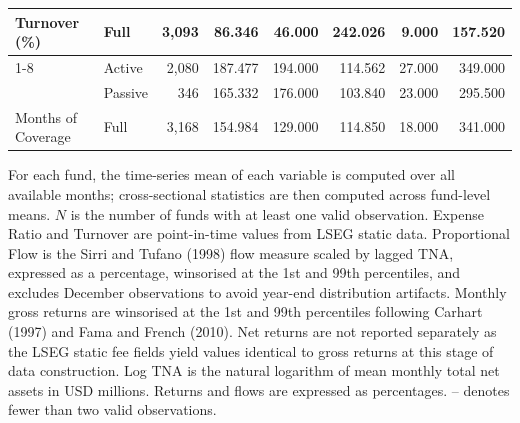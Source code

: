 \begin{table}[!h]
\begin{threeparttable}
{\begin{tabular}[t]{llrrrrrr}
\multirow{-3}{*}{\raggedright\arraybackslash Turnover (\%)} & Full & 3,093 & 86.346 & 46.000 & 242.026 & 9.000 & 157.520\\
\cmidrule{1-8}
 & Active & 2,080 & 187.477 & 194.000 & 114.562 & 27.000 & 349.000\\

 & Passive & 346 & 165.332 & 176.000 & 103.840 & 23.000 & 295.500\\

\multirow{-3}{*}{\raggedright\arraybackslash Months of Coverage} & Full & 3,168 & 154.984 & 129.000 & 114.850 & 18.000 & 341.000\\
\bottomrule
\end{tabular}
}
\begin{tablenotes}
\item For each fund, the time-series mean of each variable is computed over all available months; cross-sectional statistics are then computed across fund-level means. $N$ is the number of funds with at least one valid observation. Expense Ratio and Turnover are point-in-time values from LSEG static data. Proportional Flow is the Sirri and Tufano (1998) flow measure scaled by lagged TNA, expressed as a percentage, winsorised at the 1st and 99th percentiles, and excludes December observations to avoid year-end distribution artifacts. Monthly gross returns are winsorised at the 1st and 99th percentiles following Carhart (1997) and Fama and French (2010). Net returns are not reported separately as the LSEG static fee fields yield values identical to gross returns at this stage of data construction. Log TNA is the natural logarithm of mean monthly total net assets in USD millions. Returns and flows are expressed as percentages. -- denotes fewer than two valid observations.
\end{tablenotes}
\end{threeparttable}
\end{table}
